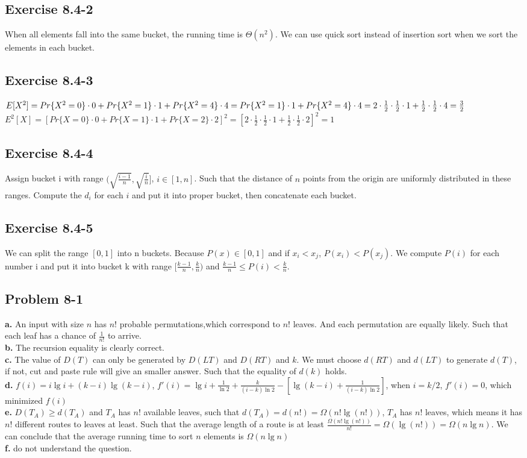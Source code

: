\documentclass[12pt]{article}
\theoremstyle{definition}
\theoremstyle{remark}
\begin{document}
\subsection*{Exercise 8.4-2}
When all elements fall into the same bucket, the running time is $\Theta(n^2)$. We can use quick sort instead of insertion sort when we sort the elements in each bucket.
\subsection*{Exercise 8.4-3}
$E[X^2]=Pr\{X^2=0\}\cdot0+Pr\{X^2=1\}\cdot1+Pr\{X^2=4\}\cdot4=\\Pr\{X^2=1\}\cdot1+Pr\{X^2=4\}\cdot4=2\cdot\frac{1}{2}\cdot\frac{1}{2}\cdot1+\frac{1}{2}\cdot\frac{1}{2}\cdot4=\frac{3}{2}$\\
$E^2[X]=[Pr\{X=0\}\cdot0+Pr\{X=1\}\cdot1+Pr\{X=2\}\cdot2]^2=[2\cdot\frac{1}{2}\cdot\frac{1}{2}\cdot1+\frac{1}{2}\cdot\frac{1}{2}\cdot2]^2=1$
\subsection*{Exercise 8.4-4}
Assign bucket i with range $(\sqrt{\frac{i-1}{n}},\sqrt{\frac{i}{n}}]$, $i\in[1,n]$. Such that the distance of $n$ points from the origin are uniformly distributed in these ranges. Compute the $d_i$ for each $i$ and put it into proper bucket, then concatenate each bucket.
\subsection*{Exercise 8.4-5}
We can split the range $[0,1]$ into n buckets. Because $P(x)\in[0,1]$ and if $x_i<x_j$, $P(x_i)<P(x_j)$. We compute $P(i)$ for each number i and put it into bucket k with range $[\frac{k-1}{n},\frac{k}{n})$ and $\frac{k-1}{n}\le P(i)<\frac{k}{n}$.
\subsection*{Problem 8-1}
\textbf{a.} An input with size $n$ has $n!$ probable permutations,which correspond to $n!$ leaves. And each permutation are equally likely. Such that each leaf has a chance of $\frac{1}{n!}$ to arrive.\\
\textbf{b.} The recursion equality is clearly correct.\\
\textbf{c.} The value of $D(T)$ can only be generated by $D(LT)$ and $D(RT)$ and $k$. We must choose $d(RT)$ and $d(LT)$ to generate $d(T)$, if not, cut and paste rule will give an smaller answer. Such that the equality of $d(k)$ holds.\\
\textbf{d.} $f(i)=i\lg{i}+(k-i)\lg(k-i)$, $f'(i)=\lg{i}+\frac{1}{\ln2}+\frac{k}{(i-k)\ln2}-[\lg(k-i)+\frac{1}{(i-k)\ln2}]$, when $i=k/2$, $f'(i)=0$, which minimized $f(i)$\\
\textbf{e.} $D(T_A)\ge d(T_A)$ and $T_A$ has $n!$ available leaves, such that $d(T_A)=d(n!)=\Omega(n!\lg(n!))$, $T_A$ has $n!$ leaves, which means it has $n!$ different routes to leaves at least. Such that the average length of a route is at least $\frac{\Omega(n!\lg(n!))}{n!}=\Omega(\lg(n!))=\Omega(n\lg{n})$. We can conclude that the average running time to sort $n$ elements is $\Omega(n\lg{n})$\\
\textbf{f.} do not understand the question.
\end{document}
